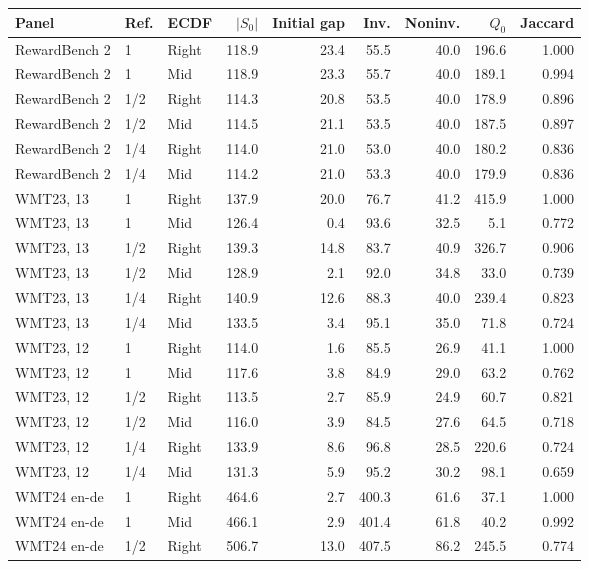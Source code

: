 \begin{table}[t]
\centering\small
\setlength{\tabcolsep}{4pt}
\begin{tabular}{lllrrrrrr}
\toprule
Panel & Ref. & ECDF & $|S_0|$ & Initial gap & Inv. & Noninv. & $Q_0$ & Jaccard \\
\midrule
RewardBench 2 & 1 & Right & 118.9 & 23.4 & 55.5 & 40.0 & 196.6 & 1.000 \\
RewardBench 2 & 1 & Mid & 118.9 & 23.3 & 55.7 & 40.0 & 189.1 & 0.994 \\
RewardBench 2 & 1/2 & Right & 114.3 & 20.8 & 53.5 & 40.0 & 178.9 & 0.896 \\
RewardBench 2 & 1/2 & Mid & 114.5 & 21.1 & 53.5 & 40.0 & 187.5 & 0.897 \\
RewardBench 2 & 1/4 & Right & 114.0 & 21.0 & 53.0 & 40.0 & 180.2 & 0.836 \\
RewardBench 2 & 1/4 & Mid & 114.2 & 21.0 & 53.3 & 40.0 & 179.9 & 0.836 \\
WMT23, 13 & 1 & Right & 137.9 & 20.0 & 76.7 & 41.2 & 415.9 & 1.000 \\
WMT23, 13 & 1 & Mid & 126.4 & 0.4 & 93.6 & 32.5 & 5.1 & 0.772 \\
WMT23, 13 & 1/2 & Right & 139.3 & 14.8 & 83.7 & 40.9 & 326.7 & 0.906 \\
WMT23, 13 & 1/2 & Mid & 128.9 & 2.1 & 92.0 & 34.8 & 33.0 & 0.739 \\
WMT23, 13 & 1/4 & Right & 140.9 & 12.6 & 88.3 & 40.0 & 239.4 & 0.823 \\
WMT23, 13 & 1/4 & Mid & 133.5 & 3.4 & 95.1 & 35.0 & 71.8 & 0.724 \\
WMT23, 12 & 1 & Right & 114.0 & 1.6 & 85.5 & 26.9 & 41.1 & 1.000 \\
WMT23, 12 & 1 & Mid & 117.6 & 3.8 & 84.9 & 29.0 & 63.2 & 0.762 \\
WMT23, 12 & 1/2 & Right & 113.5 & 2.7 & 85.9 & 24.9 & 60.7 & 0.821 \\
WMT23, 12 & 1/2 & Mid & 116.0 & 3.9 & 84.5 & 27.6 & 64.5 & 0.718 \\
WMT23, 12 & 1/4 & Right & 133.9 & 8.6 & 96.8 & 28.5 & 220.6 & 0.724 \\
WMT23, 12 & 1/4 & Mid & 131.3 & 5.9 & 95.2 & 30.2 & 98.1 & 0.659 \\
WMT24 en-de & 1 & Right & 464.6 & 2.7 & 400.3 & 61.6 & 37.1 & 1.000 \\
WMT24 en-de & 1 & Mid & 466.1 & 2.9 & 401.4 & 61.8 & 40.2 & 0.992 \\
WMT24 en-de & 1/2 & Right & 506.7 & 13.0 & 407.5 & 86.2 & 245.5 & 0.774 \\

\end{tabular}
\end{table}
